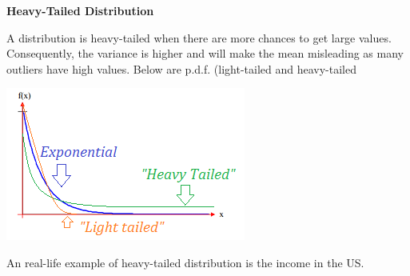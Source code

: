 {\fontsize{12pt}{22pt} \textbf{Heavy-Tailed Distribution}\par}

\vspace{5mm}

A distribution is heavy-tailed when there are more chances to get large values. Consequently, the variance is higher and will make the mean misleading as many outliers have high values. Below are p.d.f. (light-tailed and heavy-tailed

\vspace{5mm}

\begin{center}
\includegraphics[scale=0.8]{heavy-light-tailed.png}
\end{center}

An real-life example of heavy-tailed distribution is the income in the US.

\vspace{5mm}